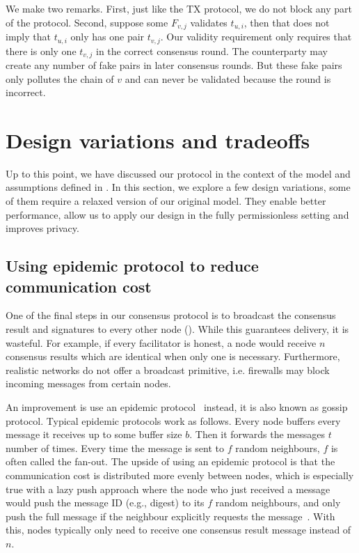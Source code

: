 We make two remarks.
First, just like the TX protocol, we do not block any part of the protocol.
Second, suppose some $F_{v, j}$ validates $t_{u, i}$, then that does not imply that $t_{u, i}$ only has one pair $t_{v, j}$.
Our validity requirement only requires that there is only one $t_{v, j}$ in the correct consensus round.
The counterparty may create any number of fake pairs in later consensus rounds.
But these fake pairs only pollutes the chain of $v$ and can never be validated because the round is incorrect.

\section{Design variations and tradeoffs}
\label{sec:tradeoffs}

Up to this point,
we have discussed our protocol in the context of the model and assumptions defined in .
In this section, 
we explore a few design variations, some of them require a relaxed version of our original model.
They enable better performance, allow us to apply our design in the fully permissionless setting and improves privacy.

\subsection{Using epidemic protocol to reduce communication cost}
One of the final steps in our consensus protocol is to broadcast the consensus result and signatures to every other node ().
While this guarantees delivery, it is wasteful.
For example, if every facilitator is honest, a node would receive $n$ consensus results which are identical when only one is necessary.
Furthermore, realistic networks do not offer a broadcast primitive,
i.e. firewalls may block incoming messages from certain nodes.

An improvement is use an epidemic protocol~\cite{eugster2004epidemic} instead, it is also known as gossip protocol.
Typical epidemic protocols work as follows.
Every node buffers every message it receives up to some buffer size $b$.
Then it forwards the messages $t$ number of times.
Every time the message is sent to $f$ random neighbours, $f$ is often called the fan-out.
The upside of using an epidemic protocol is that the communication cost is distributed more evenly between nodes,
which is especially true with a lazy push approach where the node who just received a message would push the message ID (e.g., digest) to its $f$ random neighbours,
and only push the full message if the neighbour explicitly requests the message~\cite{leitao2007epidemic}.
With this, nodes typically only need to receive one consensus result message instead of $n$.

